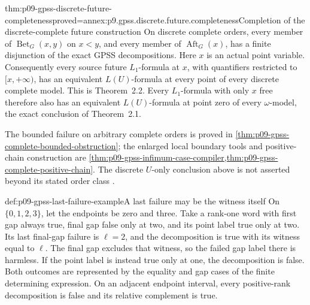 \begin{hbtheorem}{thm:p09-gpss-discrete-future-completeness}{proved=annex:p9.gpss.discrete.future.completeness}{Completion of the discrete-complete future construction}
On discrete complete orders, every member of
\(\operatorname{Bet}_G(x,y)\) on \(x<y\), and every
member of \(\operatorname{Aft}_G(x)\), has a finite
disjunction of the exact GPSS decompositions. Here \(x\)
is an actual point variable. Consequently every source future
\(L_1\)-formula at \(x\), with quantifiers restricted to
\([x,+\infty)\), has an equivalent \(L(U)\)-formula at
every point of every discrete complete model. This is Theorem~2.2.
Every \(L_1\)-formula with only \(x\) free therefore also has
an equivalent \(L(U)\)-formula at point zero of every
\(\omega\)-model, the exact conclusion of Theorem~2.1.

The bounded failure on arbitrary complete orders is proved in
\cref{thm:p09-gpss-complete-bounded-obstruction}; the enlarged local
boundary tools and positive-chain construction are
\cref{thm:p09-gpss-infimum-case-compiler,thm:p09-gpss-complete-positive-chain}.
The discrete \(U\)-only conclusion above is not asserted beyond
its stated order class
\cite[Theorems~2.1--2.2, pp.~170--171]{GabbayPnueliShelahStavi1980}.
\end{hbtheorem}

\begin{hbexample}{def:p09-gpss-last-failure-example}{A last failure may be the witness itself}
On \(\{0,1,2,3\}\), let the endpoints be zero and three.
Take a rank-one word with first gap always true, final gap false
only at two, and its point label true only at two. Its last final-gap
failure is \(\ell=2\), and the decomposition is true with
its witness equal to \(\ell\). The final gap excludes that
witness, so the failed gap label there is harmless. If the point
label is instead true only at one, the decomposition is false.
Both outcomes are represented by the equality and gap cases of the
finite determining expression. On an adjacent endpoint interval,
every positive-rank decomposition is false and its relative complement
is true.
\end{hbexample}

